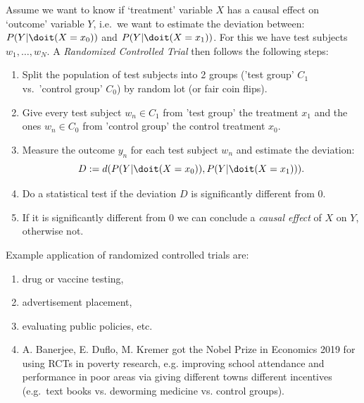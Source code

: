 \begin{Prn}\label{prn:rct}
 Assume we want to know if `treatment' variable $X$ has a causal effect on `outcome' variable $Y$, i.e.\ we want to estimate the deviation between:
$ P(Y|\doit(X=x_0))$ and  $P(Y|\doit(X=x_1))$. For this we have test subjects $w_1,\dots,w_N$.
A \emph{Randomized Controlled Trial} then follows the following steps:
\begin{enumerate}
    \item Split the population of test subjects into 2 groups ('test group' $C_1$ vs.\ 'control group' $C_0$) by random lot (or fair coin flips).
    \item Give every test subject $w_n \in C_1$ from 'test group' the treatment $x_1$ and the ones  $w_n \in C_0$ from 'control group' the control treatment $x_0$.
    \item Measure the outcome $y_n$ for each test subject $w_n$ and estimate the deviation: \[D:=d(P(Y|\doit(X=x_0)),P(Y|\doit(X=x_1))).\]
    \item Do a statistical test if the deviation $D$ is significantly different from $0$. 
    \item If it is significantly different from 0 we can conclude a \emph{causal effect} of $X$ on $Y$, otherwise not.
\end{enumerate}
\end{Prn}


\begin{Eg}
    Example application of randomized controlled trials are:
    \begin{enumerate}
        \item drug or vaccine testing,
        \item advertisement placement,
        \item evaluating public policies, etc.
        \item A. Banerjee, E. Duflo, M. Kremer got the Nobel Prize in Economics 2019 for using RCTs in poverty research, e.g.\: improving school attendance and performance in poor areas via giving different towns different incentives (e.g.\ text books vs. deworming medicine vs. control groups).
    \end{enumerate}
\end{Eg}

